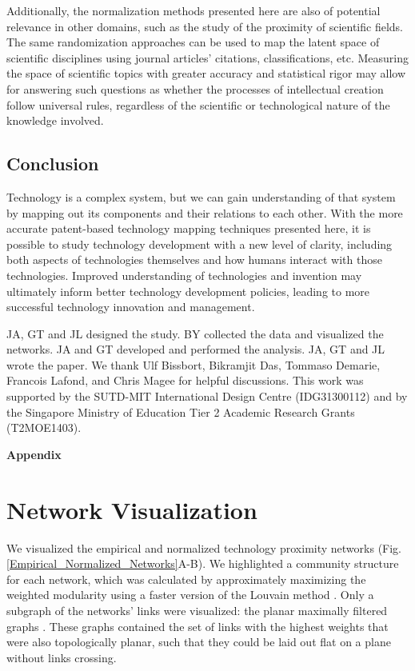 \documentclass[]{svjour3}
\newcommand{\beginappendix}{%
\setcounter{table}{0}    \renewcommand{\thetable}{A\arabic{table}}     \setcounter{figure}{0} \renewcommand{\thefigure}{A\arabic{figure}}
\setcounter{section}{0} \renewcommand{\thesection}{A\arabic{section}}
}
\begin{document}
Additionally, the normalization methods presented here are also of potential relevance in other domains, such as the study of the proximity of scientific fields. The same randomization approaches can be used to map the latent space of scientific disciplines using journal articles' citations, classifications, etc. Measuring the space of scientific topics with greater accuracy and statistical rigor may allow for answering such questions as whether the processes of intellectual creation follow universal rules, regardless of the scientific or technological nature of the knowledge involved.

\subsection{Conclusion}
Technology is a complex system, but we can gain understanding of that system by mapping out its components and their relations to each other. With the more accurate patent-based technology mapping techniques presented here, it is possible to study technology development with a new level of clarity, including both aspects of technologies themselves and how humans interact with those technologies. Improved understanding of technologies and invention may ultimately inform better technology development policies, leading to more successful technology innovation and management.

\begin{acknowledgements}
JA, GT and JL designed the study. BY collected the data and visualized the networks. JA and GT developed and performed the analysis. JA, GT and JL wrote the paper. We thank Ulf Bissbort, Bikramjit Das, Tommaso Demarie, Francois Lafond, and Chris Magee for helpful discussions. This work was supported by the SUTD-MIT International Design Centre (IDG31300112) and by the Singapore Ministry of Education Tier 2 Academic Research Grants (T2MOE1403).
\end{acknowledgements}

\newpage
\beginappendix
\pagebreak
\clearpage

\begin{center}
\textbf{\large Appendix}
\end{center}


\section{Network Visualization}\label{network_visualization}
We visualized the empirical and normalized technology proximity networks
(Fig. \ref{Empirical_Normalized_Networks}A-B). We highlighted a community structure for each network, which was calculated by approximately maximizing the weighted modularity using a faster version of the Louvain method \citep{Newman2004, Blondel2008, Traag2015}. Only a subgraph of the networks' links were visualized: the planar maximally filtered graphs \citep{Tumminello2005}. These graphs contained the set of links with the highest weights that were also topologically planar, such that they could be laid out flat on a plane without links crossing.
\end{document}

